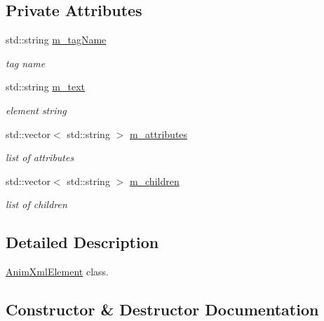\subsection*{Private Attributes}
\begin{DoxyCompactItemize}
\item 
std\+::string \hyperlink{classns3_1_1AnimationInterface_1_1AnimXmlElement_ad4d74a21b7ab46e5cb74947e923c1671}{m\+\_\+tag\+Name}
\begin{DoxyCompactList}\small\item\em tag name \end{DoxyCompactList}\item 
std\+::string \hyperlink{classns3_1_1AnimationInterface_1_1AnimXmlElement_afb5c7ec76a074dfbd270a0b2c6030632}{m\+\_\+text}
\begin{DoxyCompactList}\small\item\em element string \end{DoxyCompactList}\item 
std\+::vector$<$ std\+::string $>$ \hyperlink{classns3_1_1AnimationInterface_1_1AnimXmlElement_a9f5e8e7ead9145810f613ffc189ac291}{m\+\_\+attributes}
\begin{DoxyCompactList}\small\item\em list of attributes \end{DoxyCompactList}\item 
std\+::vector$<$ std\+::string $>$ \hyperlink{classns3_1_1AnimationInterface_1_1AnimXmlElement_a6c6c49600585414afdfd7c736d12acfe}{m\+\_\+children}
\begin{DoxyCompactList}\small\item\em list of children \end{DoxyCompactList}\end{DoxyCompactItemize}


\subsection{Detailed Description}
\hyperlink{classns3_1_1AnimationInterface_1_1AnimXmlElement}{Anim\+Xml\+Element} class. 

\subsection{Constructor \& Destructor Documentation}
